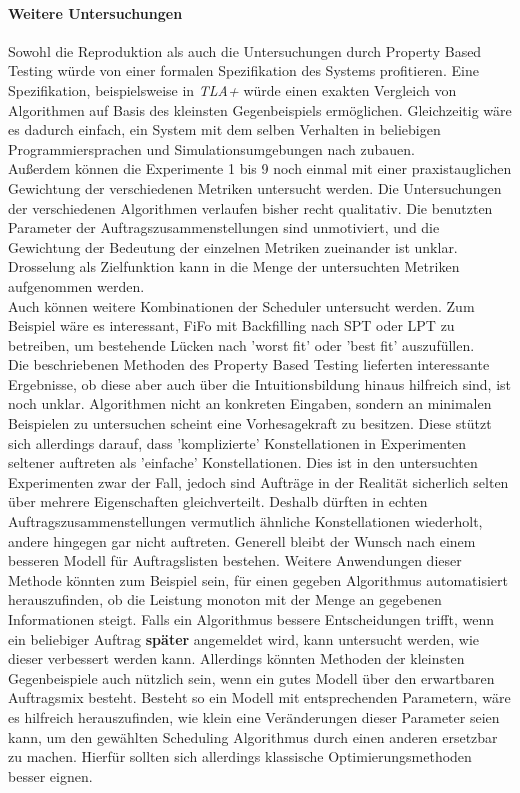 \paragraph{Weitere Untersuchungen}
Sowohl die Reproduktion als auch die Untersuchungen durch Property Based Testing würde von einer formalen Spezifikation des Systems profitieren. Eine Spezifikation, beispielsweise in \emph{TLA+} würde einen exakten Vergleich von Algorithmen auf Basis des kleinsten Gegenbeispiels ermöglichen. Gleichzeitig wäre es dadurch einfach, ein System mit dem selben Verhalten in beliebigen Programmiersprachen und Simulationsumgebungen nach zubauen.\\
Außerdem können die Experimente 1 bis 9 noch einmal mit einer praxistauglichen Gewichtung der verschiedenen Metriken untersucht werden. Die Untersuchungen der verschiedenen Algorithmen verlaufen bisher recht qualitativ. Die benutzten Parameter der Auftragszusammenstellungen sind unmotiviert, und die Gewichtung der Bedeutung der einzelnen Metriken zueinander ist unklar. Drosselung als Zielfunktion kann in die Menge der untersuchten Metriken aufgenommen werden.\\
Auch können weitere Kombinationen der Scheduler untersucht werden. Zum Beispiel wäre es interessant, FiFo mit Backfilling nach SPT oder LPT zu betreiben, um bestehende Lücken nach 'worst fit' oder 'best fit' auszufüllen.\\
Die beschriebenen Methoden des Property Based Testing lieferten interessante Ergebnisse, ob diese aber auch über die Intuitionsbildung hinaus hilfreich sind, ist noch unklar. Algorithmen nicht an konkreten Eingaben, sondern an minimalen Beispielen zu untersuchen scheint eine Vorhesagekraft zu besitzen. Diese stützt sich allerdings darauf, dass 'komplizierte' Konstellationen in Experimenten seltener auftreten als 'einfache' Konstellationen. Dies ist in den untersuchten Experimenten zwar der Fall, jedoch sind Aufträge in der Realität sicherlich selten über mehrere Eigenschaften gleichverteilt. Deshalb dürften in echten Auftragszusammenstellungen vermutlich ähnliche Konstellationen wiederholt, andere hingegen gar nicht auftreten. Generell bleibt der Wunsch nach einem besseren Modell für Auftragslisten bestehen. Weitere Anwendungen dieser Methode könnten zum Beispiel sein, für einen gegeben Algorithmus automatisiert herauszufinden, ob die Leistung monoton mit der Menge an gegebenen Informationen steigt. Falls ein Algorithmus bessere Entscheidungen trifft, wenn ein beliebiger Auftrag \textbf{später} angemeldet wird, kann untersucht werden, wie dieser verbessert werden kann. Allerdings könnten  Methoden der kleinsten Gegenbeispiele auch nützlich sein, wenn ein gutes Modell über den erwartbaren Auftragsmix besteht. Besteht so ein Modell mit entsprechenden Parametern, wäre es hilfreich herauszufinden, wie klein eine Veränderungen dieser Parameter seien kann, um den gewählten Scheduling Algorithmus durch einen anderen ersetzbar zu machen. Hierfür sollten sich allerdings klassische Optimierungsmethoden besser eignen. 